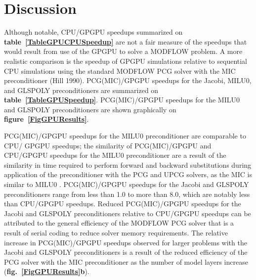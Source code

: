 \documentclass[12pt]{article}
\begin{document}
\section* {\bf Discussion}
Although notable, CPU/GPGPU speedups summarized on \textbf{table~\ref{TableGPUCPUSpeedup}} are not a fair measure of the speedups that would result from use of the GPGPU to solve a MODFLOW problem. A more realistic comparison is the speedup of GPGPU simulations relative to sequential CPU simulations using the standard MODFLOW PCG solver with the MIC preconditioner (Hill 1990). PCG(MIC)/GPGPU speedups for the Jacobi, MILU0, and GLSPOLY preconditioners are summarized on \textbf{table~\ref{TableGPUSpeedup}}.  PCG(MIC)/GPGPU speedups for the MILU0 and GLSPOLY preconditioners are shown graphically on \textbf{figure~\ref{FigGPUResults}}. 

PCG(MIC)/GPGPU speedups for the MILU0 preconditioner are comparable to CPU/ GPGPU speedups; the similarity of PCG(MIC)/GPGPU and CPU/GPGPU speedups for the MILU0 preconditioner are a result of the similarity in time required to perform forward and backward substitutions during application of the preconditioner with the PCG and UPCG solvers, as the MIC is similar to MILU0 . PCG(MIC)/GPGPU speedups for the Jacobi and GLSPOLY preconditioners range from less than 1.0 to more than 8.0, which are notably less than CPU/GPGPU speedups.  \color{cyan}Reduced PCG(MIC)/GPGPU speedups for the Jacobi and GLSPOLY preconditioners relative to CPU/GPGPU speedups can be attributed to the general efficiency of the MODFLOW PCG solver that is a result of serial coding to reduce solver memory requirements. \color{black}The relative increase in PCG(MIC)/GPGPU speedups \color{cyan}observed for larger problems with \color{black}the Jacobi and GLSPOLY preconditioners is a result of the reduced efficiency of the PCG solver with the MIC preconditioner as the number of model layers increase (\textbf{fig.~\ref{FigGPUResults}b}).
\end{document}
